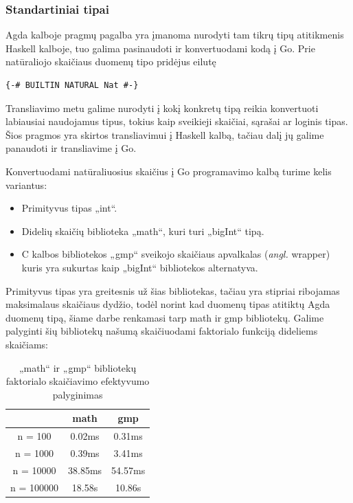 \documentclass{VUMIFPSbakalaurinis}
\begin{document}
\subsubsection{Standartiniai tipai}
Agda kalboje pragmų pagalba yra įmanoma nurodyti tam tikrų tipų atitikmenis Haskell kalboje, tuo galima pasinaudoti ir konvertuodami kodą į Go. Prie natūraliojo skaičiaus duomenų tipo pridėjus eilutę 
\begin{lstlisting}
{-# BUILTIN NATURAL Nat #-}
\end{lstlisting}
Transliavimo metu galime nurodyti į kokį konkretų tipą reikia konvertuoti labiausiai naudojamus tipus, tokius kaip sveikieji skaičiai, sąrašai ar loginis tipas. Šios pragmos yra skirtos transliavimui į Haskell kalbą, tačiau dalį jų galime panaudoti ir transliavime į Go. \par Konvertuodami natūraliuosius skaičius į Go programavimo kalbą turime kelis variantus:
\begin{itemize}
	\item Primityvus tipas „int“.
	\item Didelių skaičių biblioteka „math“, kuri turi „bigInt“ tipą.
	\item C kalbos bibliotekos „gmp“ sveikojo skaičiaus apvalkalas (\textit{angl.} wrapper) kuris yra sukurtas kaip  „bigInt“ bibliotekos alternatyva.
\end{itemize}
Primityvus tipas yra greitesnis už šias bibliotekas, tačiau yra stipriai ribojamas maksimalaus skaičiaus dydžio, todėl norint kad duomenų tipas atitiktų Agda duomenų tipą, šiame darbe renkamasi tarp math ir gmp bibliotekų. Galime palyginti šių bibliotekų našumą skaičiuodami faktorialo funkciją dideliems skaičiams:
\begin{center}
	\centering
	\begin{table}[H]
		\caption{„math“ ir „gmp“ bibliotekų faktorialo skaičiavimo efektyvumo palyginimas}
		\centering
	\begin{tabular}{ ccc } 
	\toprule
	& \textbf{math} & \textbf{gmp}  \\
	\midrule
	n = 100 & 0.02ms & 0.31ms    \\
	\midrule
	n = 1000 & 0.39ms & 3.41ms  \\
	\midrule
	n = 10000 & 38.85ms & 54.57ms  \\
	\midrule
	n = 100000 & 18.58s & 10.86s  \\
	\bottomrule
	\end{tabular}
	\centering
\end{table}
	\end{center}
\end{document}
